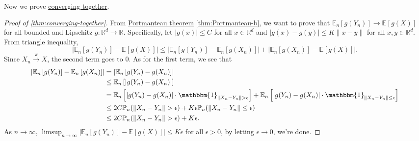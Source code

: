 Now we prove \hyperref[thm:converging-together]{converging together}.

\begin{proof}[Proof of \autoref{thm:converging-together}]
	From \hyperref[thm:Portmanteau]{Portmanteau theorem} \autoref{thm:Portmanteau-b}, we want to prove that \(\mathbb{E}_{n}\left[g(Y_n) \right] \to \mathbb{E}_{}\left[g(X) \right]\) for all bounded and Lipschitz \(g \colon \mathbb{R} ^d \to \mathbb{R} \). Specifically, let \(\vert g(x) \vert \leq C\) for all \(x \in \mathbb{R} ^d\) and \(\vert g(x) - g(y) \vert \leq K \lVert x - y \rVert \) for all \(x, y \in \mathbb{R} ^d\). From triangle inequality,
	\[
		\left\vert \mathbb{E}_{n}\left[g(Y_n) \right] - \mathbb{E}_{}\left[g(X) \right]  \right\vert
		\leq \left\vert \mathbb{E}_{n}\left[g(Y_n) \right] - \mathbb{E}_{n}\left[g(X_n) \right] \right\vert + \left\vert \mathbb{E}_{n}\left[g(X_n) \right] - \mathbb{E}_{}\left[g(X) \right] \right\vert .
	\]
	Since \(X_n \overset{\text{w} }{\to } X\), the second term goes to \(0\). As for the first term, we see that
	\[
		\begin{split}
			\left\vert \mathbb{E}_{n}\left[g(Y_n) \right] - \mathbb{E}_{n}\left[g(X_n) \right]  \right\vert
			 & = \left\vert \mathbb{E}_{n}\left[g(Y_n) - g(X_n) \right]  \right\vert                                                                                                                                                                  \\
			 & \leq \mathbb{E}_{n}\left[ \vert g(Y_n) - g(X_n) \vert \right]                                                                                                                                                                          \\
			 & = \mathbb{E}_{n}\left[\vert g(Y_n) - g(X_n) \vert \cdot \mathbbm{1}_{\lVert X_n - Y_n \rVert > \epsilon } \right] + \mathbb{E}_{n}\left[\vert g(Y_n) - g(X_n) \vert \cdot \mathbbm{1}_{\lVert X_n - Y_n \rVert \leq \epsilon } \right] \\
			 & \leq 2C \mathbb{P} _{n}(\lVert X_n - Y_n \rVert > \epsilon ) + K \epsilon \mathbb{P} _{n}(\lVert X_n - Y_n \rVert \leq \epsilon )                                                                                                      \\
			 & \leq 2C \mathbb{P}_{n} (\lVert X_n - Y_n \rVert > \epsilon ) + K \epsilon .
		\end{split}
	\]
	As \(n \to \infty \), \(\limsup_{n \to \infty} \left\vert \mathbb{E}_{n}\left[g(Y_n) \right] - \mathbb{E}_{}\left[g(X) \right]  \right\vert \leq K \epsilon\) for all \(\epsilon > 0\), by letting \(\epsilon \to 0\), we're done.
\end{proof}

